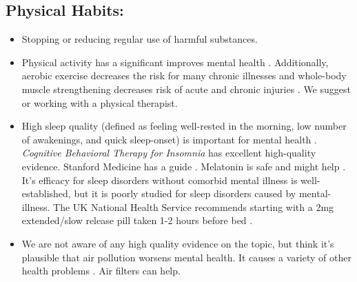 \documentclass[12pt,letterpaper]{book}
\begin{document}
\subsection*{Physical Habits:}
\begin{itemize}
   \item Stopping or reducing regular use of harmful substances.
   \item Physical activity has a significant improves mental health \cite{activityMetaAnalysis}. Additionally, aerobic exercise decreases the risk for many chronic illnesses \cite{liebermanExercised} and whole-body muscle strengthening decreases risk of acute and chronic injuries \cite{lauersenStrength}. We suggest \textcite{lowBodyweight} or working with a physical therapist.
   \item High sleep quality (defined as feeling well-rested in the morning, low number of awakenings, and quick sleep-onset) is important for  mental health \cite{scottSleep}. \textit{Cognitive Behavioral Therapy for Insomnia} has excellent high-quality evidence. Stanford Medicine has a guide \cite{stanfordSleep}. Melatonin is safe and might help \cite{moon2022role}. It's efficacy for sleep disorders without comorbid mental illness is well-established, but it is poorly studied for sleep disorders caused by mental-illness. The UK National Health Service recommends starting with a 2mg extended/slow release pill taken 1-2 hours before bed \cite{nhsMelatonin}.
   \item We are not aware of any high quality evidence on the topic, but think it's plausible that air pollution worsens mental health. It causes a variety of other health problems \cite{airPollution}. Air filters can help.
\end{itemize}
\end{document}
